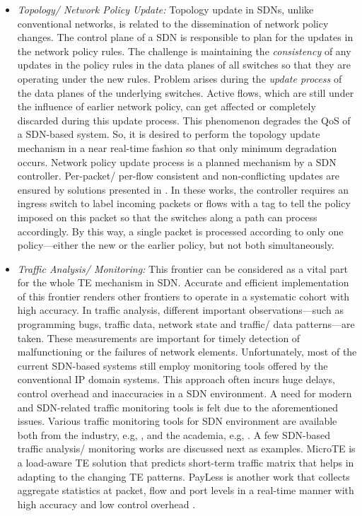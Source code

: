 \documentclass[10pt]{IEEEtran}
\begin{document}
\begin{itemize}
\vspace{1mm}
\item{\textit{Topology/ Network Policy Update:}} Topology update in SDNs, unlike conventional networks, is related to the dissemination of network policy changes. The control plane of a SDN is responsible to plan for the updates in the network policy rules. The challenge is maintaining the \textit{consistency} of any updates in the policy rules in the data planes of all switches so that they are operating under the new rules. Problem arises during the \textit{update process} of the data planes of the underlying switches. Active flows, which are still under the influence of earlier network policy, can get affected or completely discarded during this update process. This phenomenon degrades the QoS of a SDN-based system. So, it is desired to perform the topology update mechanism in a near real-time fashion so that only minimum degradation occurs. Network policy update process is a planned mechanism by a SDN controller. Per-packet/ per-flow consistent and non-conflicting updates are ensured by solutions presented in \cite{reitblatt2011consistent, reitblatt2012abstractions}. In these works, the controller requires an ingress switch to label incoming packets or flows with a tag to tell the policy imposed on this packet so that the switches along a path can process accordingly. By this way, a single packet is processed according to only one policy---either the new or the earlier policy, but not both simultaneously.

\vspace{1mm}
\item{\textit{Traffic Analysis/ Monitoring:}} This frontier can be considered as a vital part for the whole TE mechanism in SDN. Accurate and efficient implementation of this frontier renders other frontiers to operate in a systematic cohort with high accuracy. In traffic analysis, different important observations---such as programming bugs, traffic data, network state and traffic/ data patterns---are taken. These measurements are important for timely detection of malfunctioning or the failures of network elements. Unfortunately, most of the current SDN-based systems still employ monitoring tools offered by the conventional IP domain systems. This approach often incurs huge delays, control overhead and inaccuracies in a SDN environment. A need for modern and SDN-related traffic monitoring tools is felt due to the aforementioned issues. Various traffic monitoring tools for SDN environment are available both from the industry, e.g, \cite{jain2013b4, hong2013achieving}, and the academia, e.g, \cite{wang2011openflow, sherwood2009flowvisor}. A few SDN-based traffic analysis/ monitoring works are discussed next as examples.  MicroTE \cite{benson2011microte} is a load-aware TE solution that predicts short-term traffic matrix that helps in adapting to the changing TE patterns. PayLess is another work that collects aggregate statistics at packet, flow and port levels in a real-time manner with high accuracy and low control overhead \cite{chowdhury2014payless}. 

\end{itemize}
\end{document}
